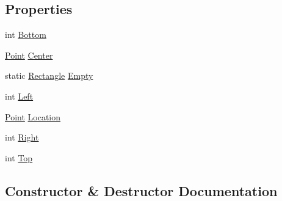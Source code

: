 \subsection*{Properties}
\begin{DoxyCompactItemize}
\item 
int \hyperlink{structMicrosoft_1_1Xna_1_1Framework_1_1Rectangle_a48ff243e9604de98f95ce6a3553ce350}{Bottom}
\item 
\hyperlink{structMicrosoft_1_1Xna_1_1Framework_1_1Point}{Point} \hyperlink{structMicrosoft_1_1Xna_1_1Framework_1_1Rectangle_a5f08f5fb906125d3d9d938455ed6606a}{Center}
\item 
static \hyperlink{structMicrosoft_1_1Xna_1_1Framework_1_1Rectangle}{Rectangle} \hyperlink{structMicrosoft_1_1Xna_1_1Framework_1_1Rectangle_a3453a1b405a47798534fc064544bcbc7}{Empty}
\item 
int \hyperlink{structMicrosoft_1_1Xna_1_1Framework_1_1Rectangle_ab6be70c549c5ceae2d6cb6695a713412}{Left}
\item 
\hyperlink{structMicrosoft_1_1Xna_1_1Framework_1_1Point}{Point} \hyperlink{structMicrosoft_1_1Xna_1_1Framework_1_1Rectangle_a34cf2c9ba7309dbeec1e02df83e02e5c}{Location}
\item 
int \hyperlink{structMicrosoft_1_1Xna_1_1Framework_1_1Rectangle_ace4946ecd4a66e40705cc19b4bd69723}{Right}
\item 
int \hyperlink{structMicrosoft_1_1Xna_1_1Framework_1_1Rectangle_a0ce92b11ec313a08cc69dadd05bd9cd0}{Top}
\end{DoxyCompactItemize}


\subsection{Constructor \& Destructor Documentation}
\hypertarget{structMicrosoft_1_1Xna_1_1Framework_1_1Rectangle_a05b3fee96f4cb13fec08235010ed9c33}{}
